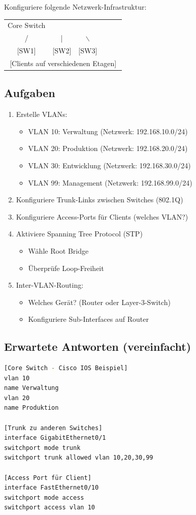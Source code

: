 \documentclass[12pt,a4paper,german]{report}
\begin{document}
Konfiguriere folgende Netzwerk-Infrastruktur:

\begin{center}
\begin{tabular}{cccccc}
Core Switch & & & & & \\
/ & | & $\backslash$ & & & \\
{[}SW1{]} & {[}SW2{]} & {[}SW3{]} & & & \\
\multicolumn{6}{c}{{[}Clients auf verschiedenen Etagen{]}} \\
\end{tabular}
\end{center}

\subsection{Aufgaben}
\begin{enumerate}
    \item Erstelle VLANs:
    \begin{itemize}
        \item VLAN 10: Verwaltung (Netzwerk: 192.168.10.0/24)
        \item VLAN 20: Produktion (Netzwerk: 192.168.20.0/24)
        \item VLAN 30: Entwicklung (Netzwerk: 192.168.30.0/24)
        \item VLAN 99: Management (Netzwerk: 192.168.99.0/24)
    \end{itemize}
    \item Konfiguriere Trunk-Links zwischen Switches (802.1Q)
    \item Konfiguriere Access-Ports für Clients (welches VLAN?)
    \item Aktiviere Spanning Tree Protocol (STP)
    \begin{itemize}
        \item Wähle Root Bridge
        \item Überprüfe Loop-Freiheit
    \end{itemize}
    \item Inter-VLAN-Routing:
    \begin{itemize}
        \item Welches Gerät? (Router oder Layer-3-Switch)
        \item Konfiguriere Sub-Interfaces auf Router
    \end{itemize}
\end{enumerate}

\subsection{Erwartete Antworten (vereinfacht)}
\begin{lstlisting}[language=bash]
[Core Switch - Cisco IOS Beispiel]
vlan 10
name Verwaltung
vlan 20
name Produktion

[Trunk zu anderen Switches]
interface GigabitEthernet0/1
switchport mode trunk
switchport trunk allowed vlan 10,20,30,99

[Access Port für Client]
interface FastEthernet0/10
switchport mode access
switchport access vlan 10
\end{lstlisting}
\end{document}
